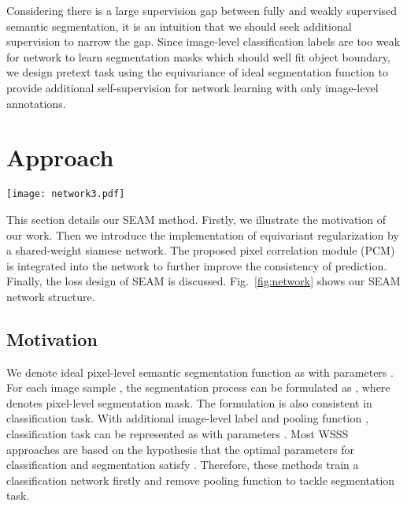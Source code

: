 \documentclass[10pt,twocolumn,letterpaper]{article}
\begin{document}
	Considering there is a large supervision gap between fully and weakly supervised semantic segmentation, it is an intuition that we should seek additional supervision to narrow the gap. Since image-level classification labels are too weak for network to learn segmentation masks which should well fit object boundary, we design pretext task using the equivariance of ideal segmentation function to provide additional self-supervision for network learning with only image-level annotations.

	\section{Approach}
	\begin{figure*}[t]
		\centering
		\texttt{[image: network3.pdf]}
		\caption{The siamese network architecture of our proposed SEAM method. The SEAM is the integration of equivariant regularization (ER) (Section.~\ref{subsec:er}) and pixel correlation module (PCM) (Section.~\ref{subsec:PCM}). With specially designed losses (Section~\ref{subsec:loss}), the revised CAMs not only keep consistent over affine transformation but also well fit the object contour.}
		\label{fig:network}
\end{figure*}
	This section details our SEAM method. Firstly, we illustrate the motivation of our work. Then we introduce the implementation of equivariant regularization by a shared-weight siamese network. The proposed pixel correlation module (PCM) is integrated into the network to further improve the consistency of prediction. Finally, the loss design of SEAM is discussed. Fig.~\ref{fig:network} shows our SEAM network structure.
	
	\subsection{Motivation}
	We denote ideal pixel-level semantic segmentation function as  with parameters . For each image sample , the segmentation process can be formulated as , where  denotes pixel-level segmentation mask. The formulation is also consistent in classification task. With additional image-level label  and pooling function , classification task can be represented as  with parameters . Most WSSS approaches are based on the hypothesis that the optimal parameters for classification and segmentation satisfy . Therefore, these methods train a classification network firstly and remove pooling function to tackle segmentation task.
	
\end{document}
